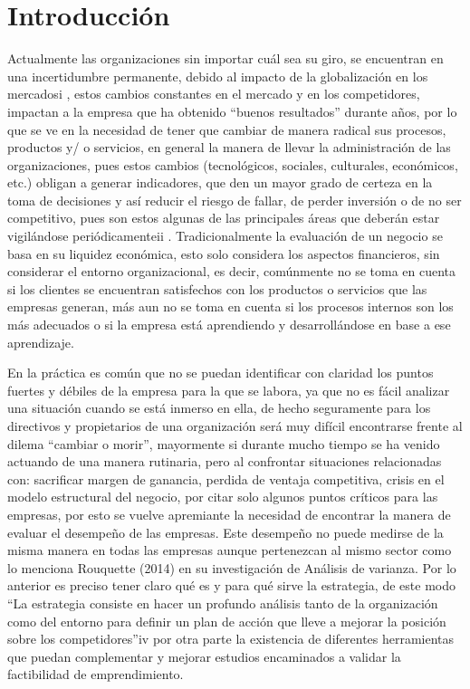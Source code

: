 \section{Introducción} 
\vspace{12mm} %
Actualmente las organizaciones sin importar cuál sea su giro, se encuentran en una incertidumbre
permanente, debido al impacto de la globalización en los mercadosi
, estos cambios constantes en el
mercado y en los competidores, impactan a la empresa que ha obtenido “buenos resultados” durante años,
por lo que se ve en la necesidad de tener que cambiar de manera radical sus procesos, productos y/ o
servicios, en general la manera de llevar la administración de las organizaciones, pues estos cambios
(tecnológicos, sociales, culturales, económicos, etc.) obligan a generar indicadores, que den un mayor grado
de certeza en la toma de decisiones y así reducir el riesgo de fallar, de perder inversión o de no ser
competitivo, pues son estos algunas de las principales áreas que deberán estar vigilándose periódicamenteii
.
Tradicionalmente la evaluación de un negocio se basa en su liquidez económica, esto solo considera los
aspectos financieros, sin considerar el entorno organizacional, es decir, comúnmente no se toma en cuenta si
los clientes se encuentran satisfechos con los productos o servicios que las empresas generan, más aun no se
toma en cuenta si los procesos internos son los más adecuados o si la empresa está aprendiendo y
desarrollándose en base a ese aprendizaje.\newline


En la práctica es común que no se puedan identificar con claridad los puntos fuertes y débiles de la empresa
para la que se labora, ya que no es fácil analizar una situación cuando se está inmerso en ella, de hecho
seguramente para los directivos y propietarios de una organización será muy difícil encontrarse frente al
dilema “cambiar o morir”, mayormente si durante mucho tiempo se ha venido actuando de una manera
rutinaria, pero al confrontar situaciones relacionadas con: sacrificar margen de ganancia, perdida de ventaja
competitiva, crisis en el modelo estructural del negocio, por citar solo algunos puntos críticos para las
empresas, por esto se vuelve apremiante la necesidad de encontrar la manera de evaluar el desempeño de las
empresas.\newline
Este desempeño no puede medirse de la misma manera en todas las empresas aunque pertenezcan al
mismo sector como lo menciona Rouquette (2014) en su investigación de Análisis de varianza.
Por lo anterior es preciso tener claro qué es y para qué sirve la estrategia, de este modo “La estrategia
consiste en hacer un profundo análisis tanto de la organización como del entorno para definir un plan de
acción que lleve a mejorar la posición sobre los competidores”iv por otra parte la existencia de diferentes
herramientas que puedan complementar y mejorar estudios encaminados a validar la factibilidad de
emprendimiento. \newline


\vspace{16mm} %